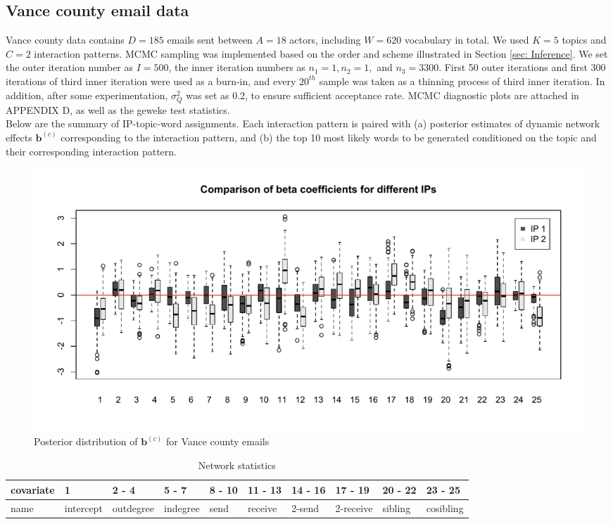 \documentclass[a4paper]{article}
\begin{document}
 \subsection{Vance county email data} \label{subsec: Vance county email data}
Vance county data contains $D=185$ emails sent between $A=18$ actors, including $W=620$ vocabulary in total. We used $K=5$ topics and $C=2$ interaction patterns. MCMC sampling was implemented based on the order and scheme illustrated in Section \ref{sec: Inference}. We set the outer iteration number as $I=500$, the inner iteration numbers as $n_1=1, n_2=1,$ and $n_3=3300$. First 50 outer iterations and first 300 iterations of third inner iteration were used as a burn-in, and every $20^{th}$ sample was taken as a thinning process of third inner iteration. In addition, after some experimentation, $\sigma_Q^2$ was set as 0.2, to ensure sufficient acceptance rate. MCMC diagnostic plots are attached in APPENDIX D, as well as the geweke test statistics. \\\newline
 Below are the summary of IP-topic-word assignments. Each interaction pattern is paired with (a) posterior estimates of dynamic network effects $\boldsymbol{b}^{(c)}$ corresponding to the interaction pattern, and (b) the top 10 most likely words to be generated conditioned on the topic and their corresponding interaction pattern.
 \begin{figure}[ht]
 	\centering
 	 	\includegraphics[width=1\textwidth]{betaplot.pdf} 
 	\caption{Posterior distribution of  $\boldsymbol{b}^{(c)}$ for Vance county emails}
 	\label{fig:Vanceboxplot}
 \end{figure}
 \begin{table}[ht]
 	\centering
 	\begin{tabular}{|l|l|l|l|l|l|l|l|l|l|}
 		\hline
 		covariate & 1&2 - 4&5 - 7& 8 - 10 & 11 - 13 & 14 - 16& 17 - 19 & 20 - 22&23 - 25\\
 	\hline	name & intercept & outdegree & indegree & send & receive & 2-send & 2-receive & sibling & cosibling\\
 	 		\hline
 	\end{tabular}
 	\caption {Network statistics}
 \end{table}
\end{document}
